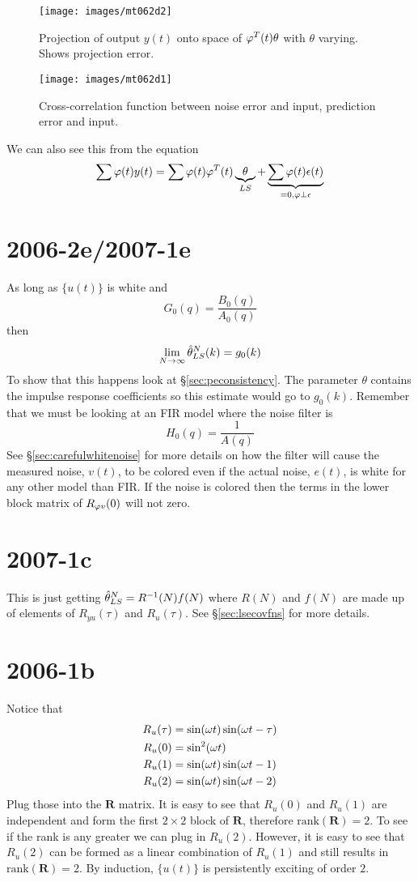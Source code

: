 \begin{figure}[ht!]
\centering
\texttt{[image: images/mt062d2]}
\caption{Projection of output $y(t)$ onto space of $\varphi^T(t)\theta$ with $\theta$ varying. Shows projection error.}
\label{fig:mt062d2}
\end{figure}

\begin{figure}[ht!]
\centering
\texttt{[image: images/mt062d1]}
\caption{Cross-correlation function between noise error and input, prediction error and input.}
\label{fig:mt062d1}
\end{figure}

We can also see this from the equation
$$\sum\varphi(t)y(t) = \sum\varphi(t)\varphi^T(t)\underbrace{\theta}_{LS} + \underbrace{\sum\varphi(t)\epsilon(t)}_{=0, \varphi\perp\epsilon}$$

\section{2006-2e/2007-1e}%
As long as $\{u(t)\}$ is white and
$$G_0(q)=\frac{B_0(q)}{A_0(q)}$$
then
$$\lim_{N\to\infty}\hat{\theta}_{LS}^N(k)=g_0(k)$$
To show that this happens look at \S\ref{sec:peconsistency}.
The parameter $\theta$ contains the impulse response coefficients so this estimate would go to $g_0(k)$.
Remember that we must be looking at an FIR model where the noise filter is
$$H_0(q)=\frac{1}{A(q)}$$
See \S\ref{sec:carefulwhitenoise} for more details on how the filter will cause the measured noise, $v(t)$, to be colored even if the actual noise, $e(t)$, is white for any other model than FIR\@.
If the noise is colored then the terms in the lower block matrix of $R_{\varphi v}(0)$ will not zero.

\section{2007-1c}%
This is just getting $\hat{\theta}_{LS}^N=R^{-1}(N)f(N)$ where $R(N)$ and $f(N)$ are made up of elements of $R_{yu}(\tau)$ and $R_u(\tau)$.
See \S\ref{sec:lsecovfns} for more details.

\section{2006-1b}%
Notice that
\begin{align*}
R_u(\tau) &= \sin(\omega t)\sin(\omega t-\tau) \\
R_u(0) &= \sin^2(\omega t) \\
R_u(1) &= \sin(\omega t)\sin(\omega t-1) \\
R_u(2) &= \sin(\omega t)\sin(\omega t-2)
\end{align*}
Plug those into the $\mathbf{R}$ matrix.
It is easy to see that $R_u(0)$ and $R_u(1)$ are independent and form the first $2\times 2$ block of $\mathbf{R}$, therefore $\text{rank}(\mathbf{R})=2$.
To see if the rank is any greater we can plug in $R_u(2)$.
However, it is easy to see that $R_u(2)$ can be formed as a linear combination of $R_u(1)$ and still results in $\text{rank}(\mathbf{R})=2$.
By induction, $\{u(t)\}$ is persistently exciting of order $2$.
